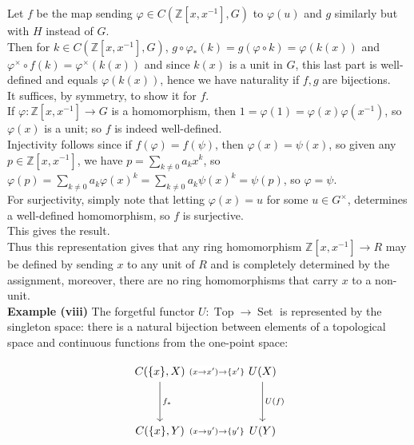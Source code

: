 \documentclass[a4paper]{article}
\DeclareMathOperator{\Set}{Set}
\DeclareMathOperator{\Top}{Top}
\begin{document}
Let $f$ be the map sending $\varphi \in C\left( \mathbb{Z}[x,x^{-1}] ,G \right) $ 
to $\varphi(u)$ and $g$ similarly but with $H$ instead of $G$.\\
Then for $k \in C\left( \mathbb{Z}[x,x^{-1}],G \right) $,
$g \circ \varphi_* (k) = 
g \left( \varphi \circ k \right) 
= \varphi \left( k(x) \right) $ and
$\varphi^{\times }\circ f (k) =
\varphi^{\times } \left( k(x) \right) $ and since 
$k(x)$ is a unit in $G$, this last part is well-defined and equals
$\varphi \left( k(x) \right) $, hence we have naturality if $f,g$ are
bijections.\\
It suffices, by symmetry, to show it for $f$.\\
If $\varphi  \colon \mathbb{Z}[x,x^{-1}] \to G$ is a homomorphism, then
$1 = \varphi(1) = \varphi(x) \varphi(x^{-1})$, so
$\varphi(x)$ is a unit; so $f$ is indeed well-defined.\\
Injectivity follows since if $f(\varphi) = f (\psi)$, then
$\varphi(x) = \psi(x)$, so given any
$p \in \mathbb{Z}\left[ x,x^{-1} \right] $, we have
$p = \sum_{k\neq 0} a_k x^{k}$, so
$\varphi(p) = \sum_{k\neq 0} a_k \varphi(x)^{k}
= \sum_{k\neq 0} a_k \psi(x)^{k} = \psi(p)$, so
$\varphi = \psi$.\\
For surjectivity, simply note that
letting $\varphi(x) = u$ for some $u \in G^{\times }$, determines
a well-defined homomorphism, so $f$ is surjective.\\
This gives the result.\\
\linebreak
Thus this representation gives that any ring homomorphism
$\mathbb{Z}\left[ x,x^{-1} \right] \to R$ may be defined by sending 
$x$ to any unit of $R$ and is completely determined by the assignment,
moreover, there are no ring homomorphisms that carry $x$ to a non-unit.\\
\linebreak
\textbf{Example (viii)} The forgetful functor
$U  \colon \Top \to \Set$ is represented by the singleton space: there is
a natural bijection between elements of a topological space and continuous
functions from the one-point space:

\[\begin{tikzcd}
	{C(\{x\}, X)} && {U(X)} \\
	\\
	{C(\{x\},Y)} && {U(Y)}
	\arrow["{f_*}", from=1-1, to=3-1]
	\arrow["{U(f)}", from=1-3, to=3-3]
	\arrow[from=1-1, to=1-3]
	\arrow["{(x \to y') \to \{y' \}}"{description}, from=3-1, to=3-3]
	\arrow["{(x \to x') \to \{x' \}}"{description}, from=1-1, to=1-3]
\end{tikzcd}\]
\end{document}
